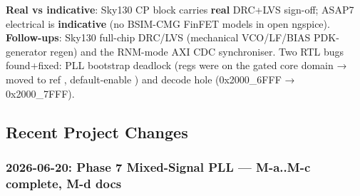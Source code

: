 \begin{record}
{}

\textbf{Real vs indicative}: Sky130 CP block carries \textbf{real}
DRC+LVS sign-off; ASAP7 electrical is \textbf{indicative} (no BSIM-CMG
FinFET models in open ngspice). \textbf{Follow-ups}: Sky130 full-chip
DRC/LVS (mechanical VCO/\allowbreak{}LF/\allowbreak{}BIAS PDK-generator
regen) and the RNM-mode AXI CDC synchroniser. Two RTL bugs found+fixed:
PLL bootstrap deadlock (regs were on the gated core domain → moved to
ref , default-enable ) and
 decode hole (0x2000\_\allowbreak{}6FFF →
0x2000\_\allowbreak{}7FFF).

\end{record}

\subsection{Recent Project Changes}\label{cr:status:phase-status:recent-project-changes}

\subsubsection{2026-06-20: Phase 7 Mixed-Signal PLL --- M-a..M-c
complete, M-d docs}\label{cr:status:phase-status:2026-06-20-phase-7-mixed-signal-pll-m-am-c-complete-m-d-docs}

